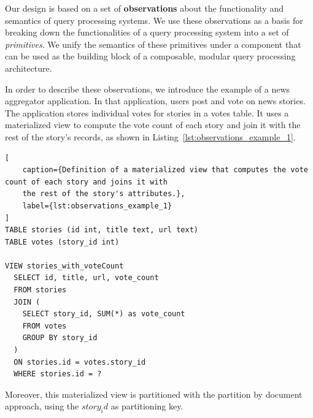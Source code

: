 



\bigskip
\noindent
Our design is based on a set of \textbf{observations} about the functionality and semantics of query processing systems.
We use these observations as a basis for breaking down the functionalities of a query processing system into a
set of \textit{primitives}.
We unify the semantics of these primitives under a component that can be used as the building block
of a composable, modular query processing architecture.

In order to describe these observations, we introduce the example of a news aggregator application.
In that application, users post and vote on news stories.
The application stores individual votes for stories in a votes table.
It uses a materialized view to compute the vote count of each story and join it with the rest of the story's records,
as shown in Listing~\ref{lst:observations_example_1}.

\begin{lstlisting}[
    caption={Definition of a materialized view that computes the vote count of each story and joins it with
    the rest of the story's attributes.},
    label={lst:observations_example_1}
]
TABLE stories (id int, title text, url text)
TABLE votes (story_id int)

VIEW stories_with_voteCount
  SELECT id, title, url, vote_count
  FROM stories
  JOIN (
    SELECT story_id, SUM(*) as vote_count
    FROM votes
    GROUP BY story_id
  )
  ON stories.id = votes.story_id
  WHERE stories.id = ?
\end{lstlisting}

Moreover, this materialized view is partitioned with the partition by document approach, using the $story_id$ as partitioning key.

